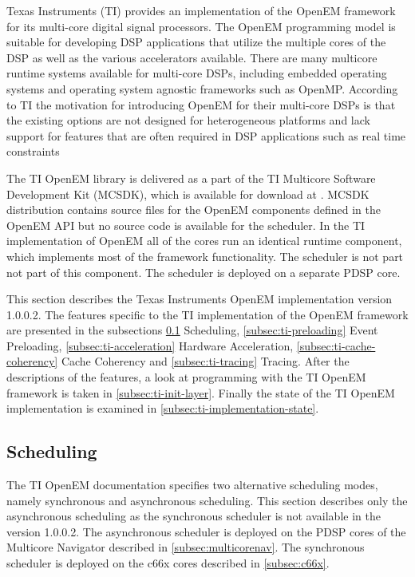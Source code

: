 Texas Instruments (TI) provides an implementation of the OpenEM framework for its multi-core digital signal processors. The OpenEM programming model is suitable for developing DSP applications that utilize the multiple cores of the DSP as well as the various accelerators available. There are many multicore runtime systems available for multi-core DSPs, including embedded operating systems and operating system agnostic frameworks such as OpenMP. According to TI the motivation for introducing OpenEM for their multi-core DSPs is that the existing options are not designed for heterogeneous platforms and lack support for features that are often required in DSP applications such as real time constraints~\cite{openemwhite}

The TI OpenEM library is delivered as a part of the TI Multicore Software Development Kit (MCSDK), which is available for download at \cite{mcsdkdown}. MCSDK distribution contains source files for the OpenEM components defined in the OpenEM API but no source code is available for the scheduler. In the TI implementation of OpenEM all of the cores run an identical runtime component, which implements most of the framework functionality. The scheduler is not part not part of this component. The scheduler is deployed on a separate PDSP core.

This section describes the Texas Instruments OpenEM implementation version 1.0.0.2. The features specific to the TI implementation of the OpenEM framework are presented in the subsections \ref{subsec:ti-scheduling} Scheduling, \ref{subsec:ti-preloading} Event Preloading, \ref{subsec:ti-acceleration} Hardware Acceleration, \ref{subsec:ti-cache-coherency} Cache Coherency and \ref{subsec:ti-tracing} Tracing. After the descriptions of the features, a look at programming with the TI OpenEM framework is taken in \ref{subsec:ti-init-layer}. Finally the state of the TI OpenEM implementation is examined in \ref{subsec:ti-implementation-state}.

\subsection{Scheduling}
\label{subsec:ti-scheduling}
The TI OpenEM documentation specifies two alternative scheduling modes, namely synchronous and asynchronous scheduling. This section describes only the asynchronous scheduling as the synchronous scheduler is not available in the version 1.0.0.2. The asynchronous scheduler is deployed on the PDSP cores of the Multicore Navigator described in \ref{subsec:multicorenav}. The synchronous scheduler is deployed on the c66x cores described in \ref{subsec:c66x}.  

